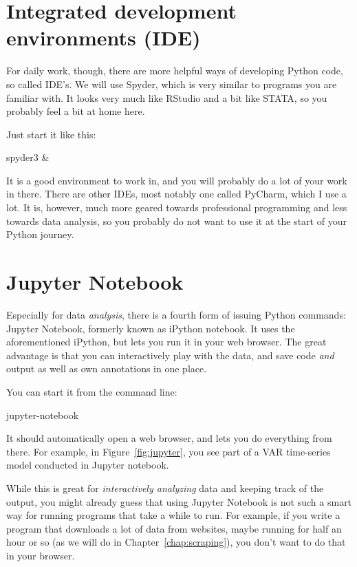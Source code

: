 \documentclass[a4paper,12pt]{book}
\begin{document}
\section{Integrated development environments (IDE)}

For daily work, though, there are more helpful ways of developing Python code, so called IDE's. We will use Spyder, which is very similar to programs you are familiar with. It looks very much like RStudio and a bit like STATA, so you probably feel a bit at home here.

Just start it like this:

\begin{lstlistingbash}
spyder3 &
\end{lstlistingbash}

It is a good environment to work in, and you will probably do a lot of your work in there. There are other IDEs, most notably one called PyCharm, which I use a lot. It is, however, much more geared towards professional programming and less towards data analysis, so you probably do not want to use it at the start of your Python journey.

 
\section{Jupyter Notebook}
\label{sec:jupyter}
Especially for data \emph{analysis}, there is a fourth form of issuing Python commands: Jupyter Notebook, formerly known as iPython notebook. It uses the aforementioned iPython, but lets you run it in your web browser. The great advantage is that you can interactively play with the data, and save code \emph{and} output as well as own annotations in one place. 

You can start it from the command line:

\begin{lstlistingbash}
	jupyter-notebook 
\end{lstlistingbash}

It should automatically open a web browser, and lets you do everything from there. For example, in Figure~\ref{fig:jupyter}, you see part of a VAR time-series model conducted in Jupyter notebook.

While this is great for \emph{interactively analyzing} data and keeping track of the output, you might already guess that using Jupyter Notebook is not such a smart way for running programs that take a while to run. For example, if you write a program that downloads a lot of data from websites, maybe running for half an hour or so (as we will do in Chapter~\ref{chap:scraping}), you don't want to do that in your browser.
\end{document}
